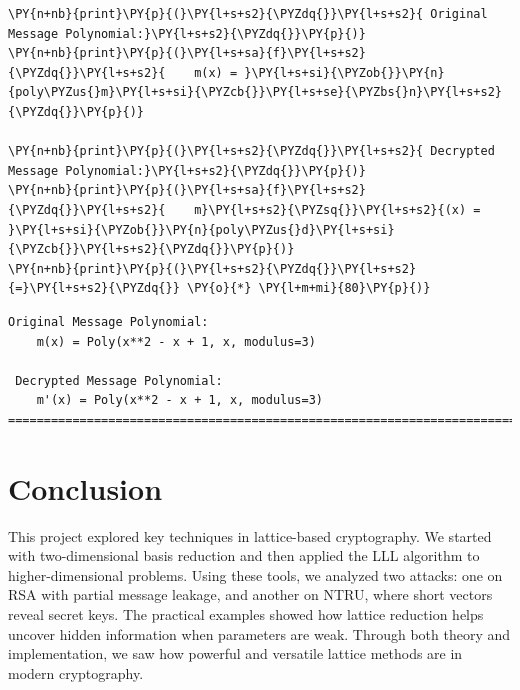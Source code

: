 \documentclass[a4paper,12pt]{article}
\begin{document}
\begin{tcolorbox}[breakable, size=fbox, boxrule=1pt, pad at break*=1mm,colback=cellbackground, colframe=cellborder]
\begin{Verbatim}[commandchars=\\\{\}]
\PY{n+nb}{print}\PY{p}{(}\PY{l+s+s2}{\PYZdq{}}\PY{l+s+s2}{ Original Message Polynomial:}\PY{l+s+s2}{\PYZdq{}}\PY{p}{)}
\PY{n+nb}{print}\PY{p}{(}\PY{l+s+sa}{f}\PY{l+s+s2}{\PYZdq{}}\PY{l+s+s2}{    m(x) = }\PY{l+s+si}{\PYZob{}}\PY{n}{poly\PYZus{}m}\PY{l+s+si}{\PYZcb{}}\PY{l+s+se}{\PYZbs{}n}\PY{l+s+s2}{\PYZdq{}}\PY{p}{)}

\PY{n+nb}{print}\PY{p}{(}\PY{l+s+s2}{\PYZdq{}}\PY{l+s+s2}{ Decrypted Message Polynomial:}\PY{l+s+s2}{\PYZdq{}}\PY{p}{)}
\PY{n+nb}{print}\PY{p}{(}\PY{l+s+sa}{f}\PY{l+s+s2}{\PYZdq{}}\PY{l+s+s2}{    m}\PY{l+s+s2}{\PYZsq{}}\PY{l+s+s2}{(x) = }\PY{l+s+si}{\PYZob{}}\PY{n}{poly\PYZus{}d}\PY{l+s+si}{\PYZcb{}}\PY{l+s+s2}{\PYZdq{}}\PY{p}{)}
\PY{n+nb}{print}\PY{p}{(}\PY{l+s+s2}{\PYZdq{}}\PY{l+s+s2}{=}\PY{l+s+s2}{\PYZdq{}} \PY{o}{*} \PY{l+m+mi}{80}\PY{p}{)}
\end{Verbatim}
\end{tcolorbox}

    \begin{Verbatim}[commandchars=\\\{\}]
 Original Message Polynomial:
    m(x) = Poly(x**2 - x + 1, x, modulus=3)

 Decrypted Message Polynomial:
    m'(x) = Poly(x**2 - x + 1, x, modulus=3)
========================================================================
    \end{Verbatim}





\newpage
\section{Conclusion}

This project explored key techniques in lattice-based cryptography. We started with two-dimensional basis reduction and then applied the LLL algorithm to higher-dimensional problems. Using these tools, we analyzed two attacks: one on RSA with partial message leakage, and another on NTRU, where short vectors reveal secret keys. The practical examples showed how lattice reduction helps uncover hidden information when parameters are weak. Through both theory and implementation, we saw how powerful and versatile lattice methods are in modern cryptography.


\end{document}
